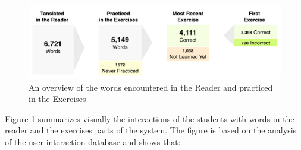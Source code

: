    \begin{figure}[h!]
  \centering
    \includegraphics[width=0.9\columnwidth]{figures/word-learning-flow.pdf}
    \caption{An overview of the words encountered in the Reader and practiced in the Exercises}
    \label{fig:word_learning_flow}
  \end{figure}

  Figure \ref{fig:word_learning_flow} summarizes visually the interactions of the students with words in the reader and the exercises parts of the system. The figure is based on the analysis of the user interaction database and shows that: 

